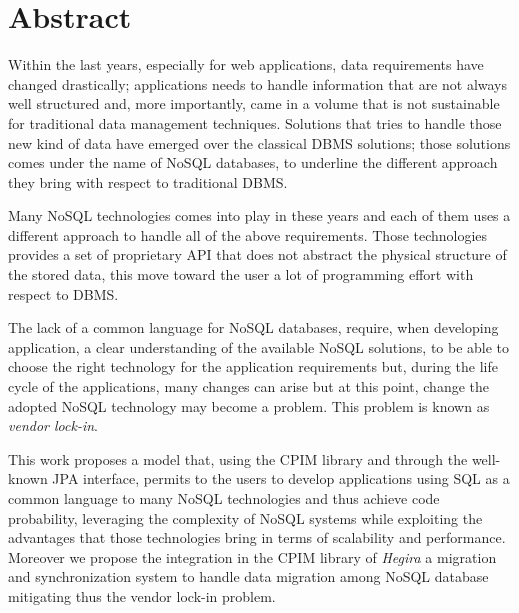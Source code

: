 \cleardoublepage

\thispagestyle{empty}

\chapter*{Abstract}
Within the last years, especially for web applications, data requirements have changed drastically; applications needs to handle information that are not always well structured and, more importantly, came in a volume that is not sustainable for traditional data management techniques. Solutions that tries to handle those new kind of data have emerged over the classical DBMS solutions; those solutions comes under the name of NoSQL databases, to underline the different approach they bring with respect to traditional  DBMS.

\noindent Many NoSQL technologies comes into play in these years and each of them uses a different approach to handle all of the above requirements. Those technologies provides a set of proprietary API that does not abstract the physical structure of the stored data, this move toward the user a lot of programming effort with respect to DBMS. 

\noindent The lack of a common language for NoSQL databases, require, when developing application, a clear understanding of the available NoSQL solutions, to be able to choose the right technology for the application requirements but, during the life cycle of the applications, many changes can arise but at this point, change the adopted NoSQL technology may become a problem. This problem is known as \textit{vendor lock-in}.  

\noindent This work proposes a model that, using the CPIM library and through the well-known JPA interface, permits to the users to develop applications using SQL as a common language to many NoSQL technologies and thus achieve code probability, leveraging the complexity of NoSQL systems while exploiting the advantages that those technologies bring in terms of scalability and performance. Moreover we propose the integration in the CPIM library of \textit{Hegira} a migration and synchronization system to handle data migration among NoSQL database mitigating thus the vendor lock-in problem.

\cleardoublepage